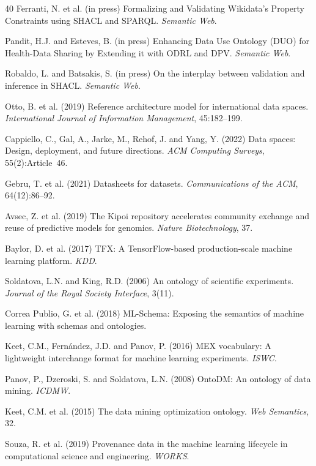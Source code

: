 \documentclass[Afour,sagev,times]{sagej}
\begin{document}
\begin{thebibliography}{40}
 Ferranti, N. et al. (in press) Formalizing and Validating Wikidata's Property Constraints using SHACL and SPARQL. \emph{Semantic Web}.

 Pandit, H.J. and Esteves, B. (in press) Enhancing Data Use Ontology (DUO) for Health-Data Sharing by Extending it with ODRL and DPV. \emph{Semantic Web}.

 Robaldo, L. and Batsakis, S. (in press) On the interplay between validation and inference in SHACL. \emph{Semantic Web}.

 Otto, B. et al. (2019) Reference architecture model for international data spaces. \emph{International Journal of Information Management}, 45:182--199.

 Cappiello, C., Gal, A., Jarke, M., Rehof, J. and Yang, Y. (2022) Data spaces: Design, deployment, and future directions. \emph{ACM Computing Surveys}, 55(2):Article~46.

 Gebru, T. et al. (2021) Datasheets for datasets. \emph{Communications of the ACM}, 64(12):86--92.

 Avsec, Z. et al. (2019) The Kipoi repository accelerates community exchange and reuse of predictive models for genomics. \emph{Nature Biotechnology}, 37.

 Baylor, D. et al. (2017) TFX: A TensorFlow-based production-scale machine learning platform. \emph{KDD}.

 Soldatova, L.N. and King, R.D. (2006) An ontology of scientific experiments. \emph{Journal of the Royal Society Interface}, 3(11).

 Correa Publio, G. et al. (2018) ML-Schema: Exposing the semantics of machine learning with schemas and ontologies.

 Keet, C.M., Fernández, J.D. and Panov, P. (2016) MEX vocabulary: A lightweight interchange format for machine learning experiments. \emph{ISWC}.

 Panov, P., Dzeroski, S. and Soldatova, L.N. (2008) OntoDM: An ontology of data mining. \emph{ICDMW}.

 Keet, C.M. et al. (2015) The data mining optimization ontology. \emph{Web Semantics}, 32.

 Souza, R. et al. (2019) Provenance data in the machine learning lifecycle in computational science and engineering. \emph{WORKS}.


\end{thebibliography}
\end{document}
